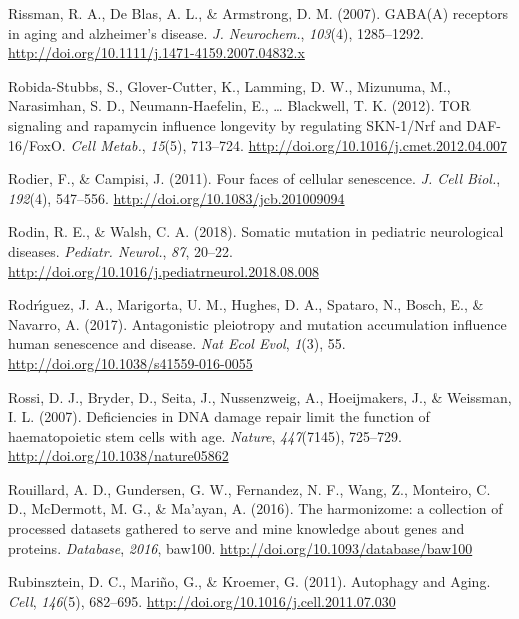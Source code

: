 \documentclass[12pt,twoside]{unicam}
\begin{document}
\begin{cslreferences}
\leavevmode\hypertarget{ref-Rissman2007}{}%
Rissman, R. A., De Blas, A. L., \& Armstrong, D. M. (2007). GABA(A) receptors in aging and alzheimer's disease. \emph{J. Neurochem.}, \emph{103}(4), 1285--1292. \url{http://doi.org/10.1111/j.1471-4159.2007.04832.x}

\leavevmode\hypertarget{ref-Robida-Stubbs2012}{}%
Robida-Stubbs, S., Glover-Cutter, K., Lamming, D. W., Mizunuma, M., Narasimhan, S. D., Neumann-Haefelin, E., \ldots{} Blackwell, T. K. (2012). TOR signaling and rapamycin influence longevity by regulating SKN-1/Nrf and DAF-16/FoxO. \emph{Cell Metab.}, \emph{15}(5), 713--724. \url{http://doi.org/10.1016/j.cmet.2012.04.007}

\leavevmode\hypertarget{ref-Rodier2011}{}%
Rodier, F., \& Campisi, J. (2011). Four faces of cellular senescence. \emph{J. Cell Biol.}, \emph{192}(4), 547--556. \url{http://doi.org/10.1083/jcb.201009094}

\leavevmode\hypertarget{ref-Rodin2018}{}%
Rodin, R. E., \& Walsh, C. A. (2018). Somatic mutation in pediatric neurological diseases. \emph{Pediatr. Neurol.}, \emph{87}, 20--22. \url{http://doi.org/10.1016/j.pediatrneurol.2018.08.008}

\leavevmode\hypertarget{ref-Rodriguez2017}{}%
Rodrı́guez, J. A., Marigorta, U. M., Hughes, D. A., Spataro, N., Bosch, E., \& Navarro, A. (2017). Antagonistic pleiotropy and mutation accumulation influence human senescence and disease. \emph{Nat Ecol Evol}, \emph{1}(3), 55. \url{http://doi.org/10.1038/s41559-016-0055}

\leavevmode\hypertarget{ref-Rossi2007}{}%
Rossi, D. J., Bryder, D., Seita, J., Nussenzweig, A., Hoeijmakers, J., \& Weissman, I. L. (2007). Deficiencies in DNA damage repair limit the function of haematopoietic stem cells with age. \emph{Nature}, \emph{447}(7145), 725--729. \url{http://doi.org/10.1038/nature05862}

\leavevmode\hypertarget{ref-Rouillard2016}{}%
Rouillard, A. D., Gundersen, G. W., Fernandez, N. F., Wang, Z., Monteiro, C. D., McDermott, M. G., \& Ma'ayan, A. (2016). The harmonizome: a collection of processed datasets gathered to serve and mine knowledge about genes and proteins. \emph{Database}, \emph{2016}, baw100. \url{http://doi.org/10.1093/database/baw100}

\leavevmode\hypertarget{ref-Rubinsztein2011}{}%
Rubinsztein, D. C., Mariño, G., \& Kroemer, G. (2011). Autophagy and Aging. \emph{Cell}, \emph{146}(5), 682--695. \url{http://doi.org/10.1016/j.cell.2011.07.030}


\end{cslreferences}
\end{document}

